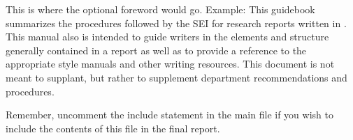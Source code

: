 \begin{foreword}
	This is where the optional foreword would go. Example: This guidebook summarizes the procedures followed by the SEI for research reports written in \LaTeXe. This manual also is intended to guide writers in the elements and structure generally contained in a report as well as to provide a reference to the appropriate style manuals and other writing resources. This document is not meant to supplant, but rather to supplement department recommendations and procedures.
	
	Remember, uncomment the include statement in the main file if you wish to include the contents of this file in the final report.
\end{foreword}
